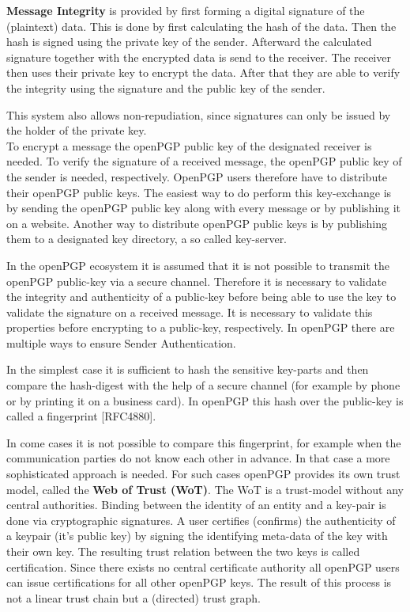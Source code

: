 \textbf{Message Integrity} is provided by first forming a digital signature of the (plaintext) data. This is done by first calculating the hash of the data. Then the hash is signed using the private key of the sender. Afterward the calculated signature together with the encrypted data is send to the receiver. The receiver then uses their private key to encrypt the data. After that they are able to verify the integrity using the signature and the public key of the sender.

This system also allows non-repudiation, since signatures can only be issued by the holder of the private key.\\


To encrypt a message the openPGP public key of the designated receiver is needed. To verify the signature of a received message, the openPGP public key of the sender is needed, respectively. OpenPGP users therefore have to distribute their openPGP public keys. The easiest way to do perform this key-exchange is by sending the openPGP public key along with every message or by publishing it on a website. Another way to distribute openPGP public keys is by publishing them to a designated key directory, a so called key-server.


In the openPGP ecosystem it is assumed that it is not possible to transmit the openPGP public-key via a secure channel. Therefore it is necessary to validate the integrity and authenticity of a public-key before being able to use the key to validate the signature on a received message. It is necessary to validate this properties before encrypting to a public-key, respectively. In openPGP there are multiple ways to ensure Sender Authentication.

In the simplest case it is sufficient to hash the sensitive key-parts and then compare the hash-digest with the help of a secure channel (for example by phone or by printing it on a business card). In openPGP this hash over the public-key is called a fingerprint [RFC4880].


In come cases it is not possible to compare this fingerprint, for example when the communication parties do not know each other in advance. In that case a more sophisticated approach is needed. For such cases openPGP provides its own trust model, called the \textbf{Web of Trust (WoT)}. The WoT is a trust-model without any central authorities. Binding between the identity of an entity and a key-pair is done via cryptographic signatures. A user certifies (confirms) the authenticity of a keypair (it's public key) by signing the identifying meta-data of the key with their own key. The resulting trust relation between the two keys is called certification. Since there exists no central certificate authority all openPGP users can issue certifications for all other openPGP keys. The result of this process is not a linear trust chain but a (directed) trust graph. \\


